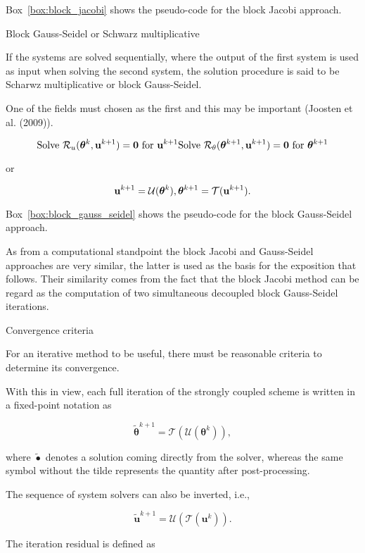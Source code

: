 Box~\ref{box:block_jacobi} shows the pseudo-code for the block Jacobi approach.

 Block Gauss-Seidel or Schwarz multiplicative

If the systems are solved sequentially, where the output of the first system is used as input when solving the second system, the solution procedure is said to be Scharwz multiplicative or block Gauss-Seidel.

One of the fields must chosen as the first and this may be important (Joosten et al. (2009)).

$$
\text{Solve }\mathcal R_u(\boldsymbol \theta^{k},\mathbf u^{k+1}) = \mathbf 0\text{ for \(\mathbf u^{k+1}\)}\\
\text{Solve }\mathcal R_\theta(\boldsymbol \theta^{k+1}, \mathbf u^{k+1}) = \mathbf 0\text{ for \(\boldsymbol \theta^{k+1}\)}
$$

or

$$
\mathbf u^{k+1}  = \mathcal U(\boldsymbol \theta^k),\\
\boldsymbol \theta^{k+1} = \mathcal T(\mathbf u^{k+1}).
$$

Box~\ref{box:block_gauss_seidel} shows the pseudo-code for the block Gauss-Seidel approach.

As from a computational standpoint the block Jacobi and Gauss-Seidel approaches are very similar, the latter is used as the basis for the exposition that follows. Their similarity comes from the fact that the block Jacobi method can be regard as the computation of two simultaneous decoupled block Gauss-Seidel iterations.

 Convergence criteria

For an iterative method to be useful, there must be reasonable criteria to determine its convergence.

With this in view, each full iteration of the strongly coupled scheme is written in a fixed-point notation as

$$
\tilde{\boldsymbol \theta}^{k+1} = \mathcal T \left(\mathcal U(\boldsymbol \theta^k)\right),
$$

where $\tilde{\bullet}$ denotes a solution coming directly from the solver, whereas the same symbol without the tilde represents the quantity after post-processing.

The sequence of system solvers can also be inverted, i.e.,

$$
\tilde{\mathbf u}^{k+1} = \mathcal U\left(\mathcal T(\mathbf u^k)\right).
$$

The iteration residual is defined as

